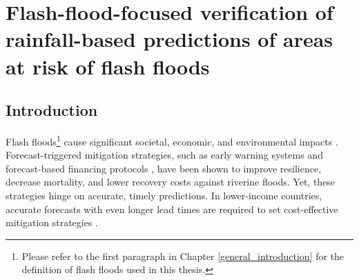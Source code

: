 \ClearShipoutPicture
{}

\chapter{Flash-flood-focused verification of rainfall-based 
predictions of areas at risk of flash floods}
\label{flash_flood_focused_verification_rainfall_based_ff}
\graphicspath{{chapter_05/figures}{chapter_05/tables}}


\section{Introduction}
\label{flash_flood_focused_verification_rainfall_based_ff_introduction}

Flash  floods\footnote{Please refer to the first paragraph in Chapter \ref{general_introduction} for the definition of flash floods used in this thesis.} cause significant societal, economic, and environmental impacts \citep{Dordevic_2020}. Forecast-triggered mitigation strategies, such as early warning systems \citep{CoughlanDePerez_2022, SakicTrogrlic_2022} and forecast-based financing protocols \citep{Bischiniotis_2019a, Perez_2016}, have been shown to improve resilience, decrease mortality, and lower recovery costs against riverine floods. Yet, these strategies hinge on accurate, timely predictions. In lower-income countries, accurate forecasts with even longer lead times are required to set cost-effective mitigation strategies \citep{Bazo_2019, Kiptum_2023}. 


